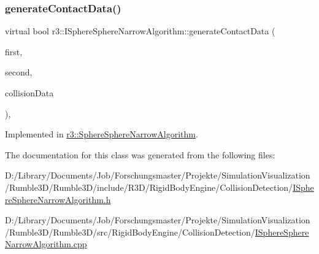 \subsubsection{\texorpdfstring{generate\+Contact\+Data()}{generateContactData()}\hspace{0.1cm}{\footnotesize\ttfamily [2/2]}}
{\footnotesize\ttfamily virtual bool r3\+::\+I\+Sphere\+Sphere\+Narrow\+Algorithm\+::generate\+Contact\+Data (\begin{DoxyParamCaption}\item[{\mbox{\hyperlink{classr3_1_1_collision_sphere}{Collision\+Sphere}} $\ast$}]{first,  }\item[{\mbox{\hyperlink{classr3_1_1_collision_sphere}{Collision\+Sphere}} $\ast$}]{second,  }\item[{\mbox{\hyperlink{classr3_1_1_collision_data}{Collision\+Data}} \&}]{collision\+Data }\end{DoxyParamCaption})\hspace{0.3cm}{\ttfamily [protected]}, {}}



Implemented in \mbox{\hyperlink{classr3_1_1_sphere_sphere_narrow_algorithm_a9f4413a6441f638e37867045ac3ab429}{r3\+::\+Sphere\+Sphere\+Narrow\+Algorithm}}.



The documentation for this class was generated from the following files\+:\begin{DoxyCompactItemize}
\item 
D\+:/\+Library/\+Documents/\+Job/\+Forschungsmaster/\+Projekte/\+Simulation\+Visualization/\+Rumble3\+D/\+Rumble3\+D/include/\+R3\+D/\+Rigid\+Body\+Engine/\+Collision\+Detection/\mbox{\hyperlink{_i_sphere_sphere_narrow_algorithm_8h}{I\+Sphere\+Sphere\+Narrow\+Algorithm.\+h}}\item 
D\+:/\+Library/\+Documents/\+Job/\+Forschungsmaster/\+Projekte/\+Simulation\+Visualization/\+Rumble3\+D/\+Rumble3\+D/src/\+Rigid\+Body\+Engine/\+Collision\+Detection/\mbox{\hyperlink{_i_sphere_sphere_narrow_algorithm_8cpp}{I\+Sphere\+Sphere\+Narrow\+Algorithm.\+cpp}}\end{DoxyCompactItemize}
